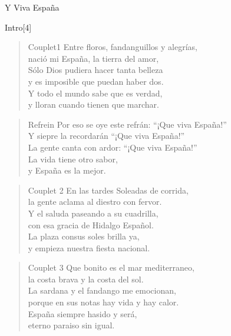 \begin{song}{Y Viva España}
\small

\begin{instrumental}{Intro}[4]
\end{instrumental}

\begin{verse}{Couplet1}
Entre floros, fandanguillos y alegrías,\\
nació mi España, la tierra del amor,\\
Sólo Dios pudiera hacer tanta belleza\\
y es imposible que puedan haber dos.\\
Y todo el mundo sabe que es verdad,\\
y lloran cuando tienen que marchar.
\end{verse}


\begin{verse}{Refrein}
Por eso se oye este refrán: 
``¡Que viva España!''\\
Y siepre la recordarán\chord{} 
``¡Que viva España!''\\
La gente canta con ardor:\chord{} 
``¡Que viva España!''\\
La vida tiene otro sabor,\chord{}\\
y España es la mejor.
\end{verse}

\begin{verse}{Couplet 2}
En las tardes Soleadas de corrida,\\
la gente aclama al diestro con fervor.\\
Y el saluda paseando a su cuadrilla,\\
con esa gracia de Hidalgo Español.\\
La plaza consus soles brilla ya,\\
y empieza nuestra fiesta nacional.
\end{verse}


\begin{verse}{Couplet 3}
Que bonito es el mar mediterraneo,\\
la costa brava y la costa del sol.\\
La sardana y el fandango me emocionan,\\
porque en sus notas hay vida y hay calor.\\
España siempre hasido y será,\\
eterno paraiso sin igual.
\end{verse}


\end{song}

